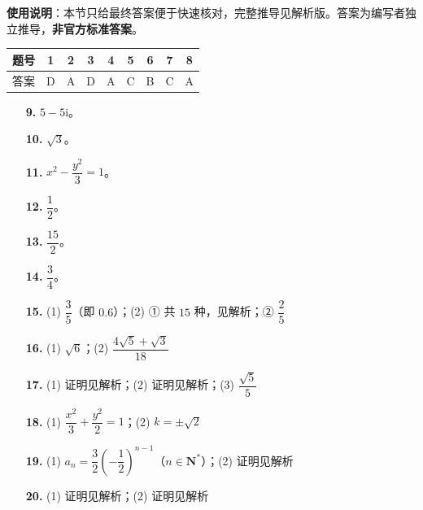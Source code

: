 
\begin{gknotice}
\textbf{使用说明}：本节只给最终答案便于快速核对，完整推导见解析版。答案为编写者独立推导，\textbf{非官方标准答案}。
\end{gknotice}

\begin{center}\begin{tabular}{ccccccccc}
\toprule
题号 & 1 & 2 & 3 & 4 & 5 & 6 & 7 & 8 \\
\midrule
答案 & D & A & D & A & C & B & C & A \\
\bottomrule
\end{tabular}\end{center}

\begin{itemize}[leftmargin=2.6em]
  \item[\textbf{9.}] $5-5\mathrm i$。
  \item[\textbf{10.}] $\sqrt3$。
  \item[\textbf{11.}] $x^2-\dfrac{y^2}3=1$。
  \item[\textbf{12.}] $\dfrac12$。
  \item[\textbf{13.}] $\dfrac{15}2$。
  \item[\textbf{14.}] $\dfrac34$。
\end{itemize}

\begin{itemize}[leftmargin=2.6em]
  \item[\textbf{15.}] (1) $\dfrac35$（即 $0.6$）；(2) ① 共 $15$ 种，见解析；② $\dfrac25$
  \item[\textbf{16.}] (1) $\sqrt6$；(2) $\dfrac{4\sqrt5+\sqrt3}{18}$
  \item[\textbf{17.}] (1) 证明见解析；(2) 证明见解析；(3) $\dfrac{\sqrt5}5$
  \item[\textbf{18.}] (1) $\dfrac{x^2}3+\dfrac{y^2}2=1$；(2) $k=\pm\sqrt2$
  \item[\textbf{19.}] (1) $a_n=\dfrac32\left(-\dfrac12\right)^{n-1}$（$n\in\mathbf N^*$）；(2) 证明见解析
  \item[\textbf{20.}] (1) 证明见解析；(2) 证明见解析
\end{itemize}
